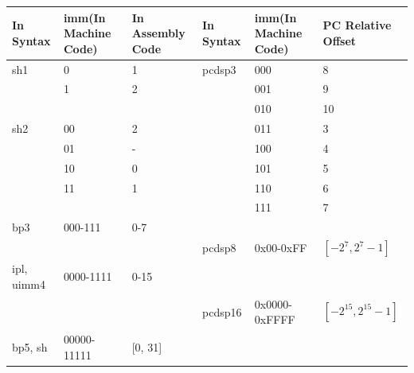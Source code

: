 \clearpage
\begin{table}
\begin{subtable}{\linewidth}
\scriptsize
\begin{center}
\begin{tabular}{lll|lll}
\hline
In Syntax   & imm(In Machine Code)  & In Assembly Code         & In Syntax & imm(In Machine Code)  & PC Relative Offset         \\ \hline
sh1         & 0                     & 1                        & pcdsp3    & 000                   & 8                          \\
            & 1                     & 2                        &           & 001                   & 9                          \\
            &                       &                          &           & 010                   & 10                         \\
sh2         & 00                    & 2                        &           & 011                   & 3                          \\
            & 01                    & -                        &           & 100                   & 4                          \\
            & 10                    & 0                        &           & 101                   & 5                          \\
            & 11                    & 1                        &           & 110                   & 6                          \\
            &                       &                          &           & 111                   & 7                          \\
bp3         & 000-111               & 0-7                      &           &                       &                            \\
            &                       &                          & pcdsp8    & 0x00-0xFF             & $[-2^{7}, 2^{7}-1]$        \\
ipl, uimm4  & 0000-1111             & 0-15                     &           &                       &                            \\
            &                       &                          & pcdsp16   & 0x0000-0xFFFF         & $[-2^{15}, 2^{15}-1]$      \\
bp5, sh     & 00000-11111           & [0, 31]                  &           &                       &                            \\

\end{tabular}
\end{center}
\end{subtable}
\end{table}
